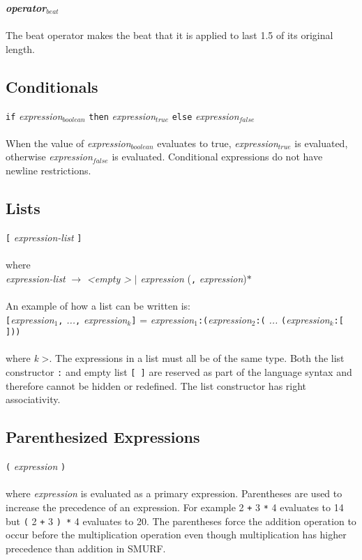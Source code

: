 \textbf{\emph{operator$_{beat}$}} \\ \\
The beat operator makes the beat that it is applied to last 
1.5 of its original length. 

    
\subsection{Conditionals}
  \texttt{if} \emph{expression$_{boolean}$} \texttt{then}  \emph{expression$_{true}$} \texttt{else}  \emph{expression$_{false}$} \\ \\
  When the value of \emph{expression$_{boolean}$} evaluates to true, \emph{expression$_{true}$} is evaluated, otherwise  \emph{expression$_{false}$} is evaluated. Conditional expressions do not have newline restrictions.

\subsection{Lists}
  \texttt{[} \emph{expression-list} \texttt{]} \\ \\
  where \\
  
  \emph{expression-list} $\rightarrow$  
  \emph{\textless empty \textgreater} $|$
  \emph{expression} (\texttt{,} \emph{expression})$*$  \\ \\
An example of how a list can be written is: \\

\texttt{[}\emph{expression$_{1}$}\texttt{,} \emph{...}\texttt{,} \emph{expression$_{k}$}\texttt{]} = 
  \emph{expression$_{1}$}\texttt{:(}\emph{expression$_{2}$}\texttt{:(} \emph{...} \texttt{(}\emph{expression$_{k}$}\texttt{:[ ]))} \\ \\
where \textit{k} \textgreater{}. The expressions in a list must all be of the same type. Both the list constructor \texttt{:} and empty list \texttt{[ ]} are reserved as part of the language syntax and therefore cannot be hidden or redefined. The list constructor has right associativity.

\subsection{Parenthesized Expressions}
  \texttt{(} \emph{expression} \texttt{)} \\ \\
  where \emph{expression} is evaluated as a primary expression. Parentheses are used to increase the precedence of an expression. For example 2 \texttt{+} 3 \texttt{*}  4  evaluates to 14 but \texttt{(} 2 \texttt{+} 3 \texttt{) *}  4 evaluates to 20. The parentheses force the addition operation to occur before the multiplication operation even though multiplication has higher precedence than addition in SMURF.

